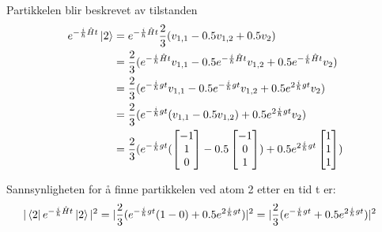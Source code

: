 \documentclass[norsk,a4paper,12pt]{article}
\begin{document}
	Partikkelen blir beskrevet av tilstanden
	\begin{equation}
	\begin{aligned}
	e^{-\frac{i}{\hbar}\hat{H}t} \ket{2} &= e^{-\frac{i}{\hbar}\hat{H}t} \frac{2}{3}(v_{1,1} - 0.5v_{1,2} + 0.5 v_2) \\
	&= \frac{2}{3}(e^{-\frac{i}{\hbar}\hat{H}t} v_{1,1} - 0.5e^{-\frac{i}{\hbar}\hat{H}t} v_{1,2} + 0.5e^{-\frac{i}{\hbar}\hat{H}t} v_{2}) \\
	&= \frac{2}{3}(e^{-\frac{i}{\hbar}gt} v_{1,1} - 0.5e^{-\frac{i}{\hbar}gt} v_{1,2} + 0.5e^{2\frac{i}{\hbar}gt} v_{2}) \\
	&= \frac{2}{3}(e^{-\frac{i}{\hbar}gt} (v_{1,1} - 0.5v_{1,2}) + 0.5e^{2\frac{i}{\hbar}gt} v_{2}) \\
	&= \frac{2}{3}(e^{-\frac{i}{\hbar}gt} (\left[ \begin{matrix} -1 \\ 1 \\ 0 \end{matrix} \right] - 0.5\left[ \begin{matrix} -1 \\ 0 \\ 1 \end{matrix} \right]) + 0.5e^{2\frac{i}{\hbar}gt} \left[ \begin{matrix} 1 \\ 1 \\ 1 \end{matrix} \right])
	\end{aligned}
	\end{equation}
	
	Sannsynligheten for å finne partikkelen ved atom 2 etter en tid t er:
	\begin{equation}
	\begin{aligned}
	|\bra{2} e^{-\frac{i}{\hbar}\hat{H}t} \ket{2}|^2 &= |\frac{2}{3}(e^{-\frac{i}{\hbar}gt} (1 - 0) + 0.5e^{2\frac{i}{\hbar}gt})|^2 = |\frac{2}{3}(e^{-\frac{i}{\hbar}gt} + 0.5e^{2\frac{i}{\hbar}gt})|^2
	\end{aligned}
	\end{equation}

	
	
\end{document}
